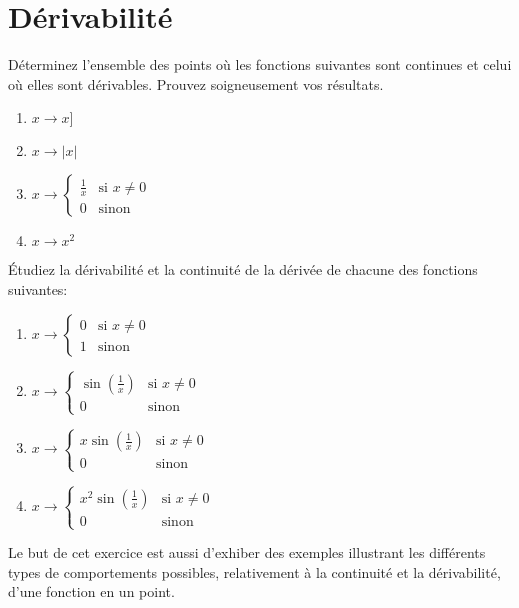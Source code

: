 \section{Dérivabilité}



\exerNico Déterminez l'ensemble des points où les fonctions suivantes
sont continues et celui où elles sont dérivables. Prouvez soigneusement
vos résultats.
\begin{enumerate}
\item $ x \rightarrow x]$
\item $ x \rightarrow |x| $
\item $ x \rightarrow
	\left\{ \begin{array}{ll}
	\frac{1}{x} & \mbox{si } x \not= 0 \\
	0 & \mbox{sinon}
	\end{array} \right. $
\item $ x \rightarrow x^2  $
\end{enumerate}




\exerNico Étudiez la dérivabilité et la continuité
de la dérivée de chacune des fonctions suivantes:
\begin{enumerate}
\item $ x \rightarrow
\left\{ \begin{array}{ll}
0 & \mbox{si } x \not= 0 \\
1 & \mbox{sinon}
\end{array} \right.$
%
\item $ x \rightarrow
\left\{ \begin{array}{ll}
\sin(\frac{1}{x}) & \mbox{si } x \not= 0 \\
0 & \mbox{sinon}
\end{array} \right.$
%
\item $ x \rightarrow
\left\{ \begin{array}{ll}
x \sin(\frac{1}{x}) & \mbox{si } x \not= 0 \\
0 & \mbox{sinon}
\end{array} \right.$
%
\item $ x \rightarrow
\left\{ \begin{array}{ll}
x^2 \sin(\frac{1}{x}) & \mbox{si } x \not= 0 \\
0 & \mbox{sinon}
\end{array} \right.$
\end{enumerate}

Le but de cet exercice est aussi d'exhiber des exemples illustrant les
différents types de comportements possibles, relativement à la
continuité et la dérivabilité, d'une fonction en un point.

